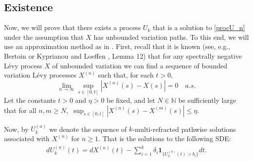 \documentclass[12pt,reqno]{amsart}
\theoremstyle{definition}
\theoremstyle{remark}
\newcommand{\ind}{\mathbf{1}}
\begin{document}
\subsection{Existence}
 Now, we will prove  that there exists a process $U_k$ that is a solution
	to	\eqref{procU_n} under the assumption that $X$ has unbounded variation paths. To this end, we will use an approximation 
	method as in \cite{kyprianouloeffen2010}. First, recall that it is known (see, e.g., Bertoin \cite{bertoin1996} or Kyprianou and Loeffen
		\cite{kyprianouloeffen2010}, Lemma 12) that for any spectrally negative L\'evy process $X$ of unbounded variation 
		we can find a sequence of bounded variation L\'evy processes $X^{(n)}$ such that, for
		each $t>0$,
		\[
		\lim_{n\to\infty}\sup_{s\in[0,t]}|X^{(n)}(s)-X(s)|=0 \quad a.s.
		\]
		Let the constants $t > 0$ and  $\eta>0$ be fixed, and let $N \in \mathbb{N}$ be sufficiently large that for all $n,m \geq N ,$ 
		$\sup_{s \in [0,t]} |X^{(n)}(s)-X^{(m)}(s)| \leq \eta$. 
		
		Now, by $U^{(n)}_k$ we denote the sequence of $k$-multi-refracted pathwise solutions associated with $X^{(n)}$ for $n \geq 1$. 
		That is the solutions to the following SDE:
		\begin{align*}
			dU_k^{(n)}(t)=dX^{(n)}(t)-\sum_{i=1}^k\delta_i\ind_{\{U_k^{(n)}(t)>b_i\}}dt.
		\end{align*}
		
\end{document}
